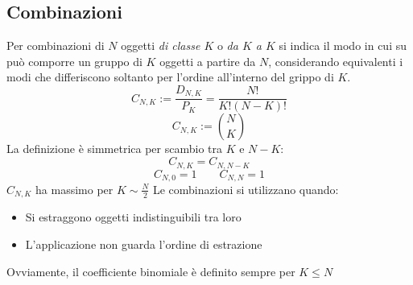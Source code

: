 \documentclass[11pt,a4paper]{book}
\begin{document}
\subsection{Combinazioni} 
Per combinazioni di $ N $ oggetti \textit{di classe $ K $} o \textit{da $ K $ a $ K $} si indica il modo in cui su può comporre un gruppo di $ K $ oggetti a partire da $ N $, considerando equivalenti i modi che differiscono soltanto per l'ordine all'interno del grippo di $ K $.
\begin{equation}
C_{N,K}:= \frac{D_{N,K}}{P_K} = \frac{N!}{K! (N-K)!}
\end{equation}
\begin{equation}
C_{N,K}:= \binom{N}{K}
\end{equation}
La definizione è simmetrica per scambio tra $ K $ e $ N-K $:
\begin{equation}
C_{N,K} = C_{N,N-K}
\end{equation}
\begin{equation}
C_{N,0} = 1 \qquad C_{N,N} = 1
\end{equation}
$ C_{N,K} $ ha massimo per $ K \sim \frac{N}{2} $
Le combinazioni si utilizzano quando:
\begin{itemize}
\item Si estraggono oggetti indistinguibili tra loro
\item L'applicazione non guarda l'ordine di estrazione
\end{itemize}
Ovviamente, il coefficiente binomiale è definito sempre per $ K \leq N $
\end{document}
